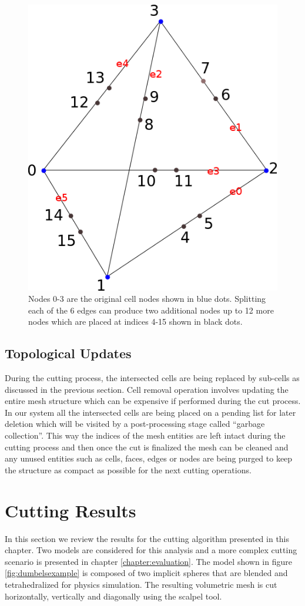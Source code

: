 \begin{figure}[H]
  \centering
  \includegraphics[width=0.4\linewidth]{figures/cutting/midpoints.png}
  \caption{\label{fig:midpoints}
  {Nodes 0-3 are the original cell nodes shown in blue dots. Splitting each of the 6 edges can produce two additional nodes up to 12 more nodes which 
  are placed at indices 4-15 shown in black dots.}
}
\end{figure}

\subsection{Topological Updates}
During the cutting process, the intersected cells are being replaced by sub-cells as discussed in the previous section. Cell removal operation involves updating the entire 
mesh structure which can be expensive if performed during the cut process. In our system all the intersected cells are being placed on a pending list for later deletion 
which will be visited by a post-processing stage called ``garbage collection''. This way the indices of the mesh entities are left intact during the cutting process and 
then once the cut is finalized the mesh can be cleaned and any unused entities such as cells, faces, edges or nodes are being purged to keep the structure as compact as 
possible for the next cutting operations.

\section{Cutting Results}
In this section we review the results for the cutting algorithm presented in this chapter. 
Two models are considered for this analysis and a more complex cutting scenario is presented in chapter \ref{chapter:evaluation}.
The model shown in figure \ref{fig:dumbelsexample} is composed of two implicit spheres that are blended and tetrahedralized for 
physics simulation. The resulting volumetric mesh is cut horizontally, vertically and diagonally using the scalpel tool. 

